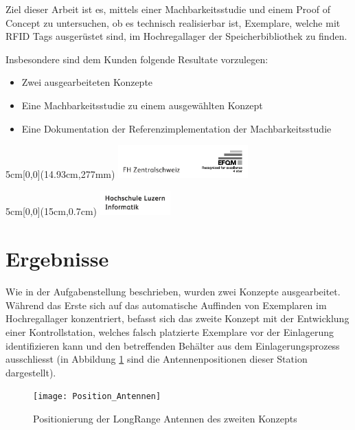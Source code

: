 \documentclass[
	a4paper
]{scrartcl}
\begin{document}
Ziel dieser Arbeit ist es, mittels einer Machbarkeitsstudie und einem Proof of Concept zu untersuchen, ob es technisch realisierbar ist, Exemplare, welche mit RFID Tags ausgerüstet sind, im Hochregallager der Speicherbibliothek zu finden.

Insbesondere sind dem Kunden folgende Resultate vorzulegen:
\begin{itemize}[noitemsep]
	\item Zwei ausgearbeiteten Konzepte
	\item Eine Machbarkeitsstudie zu einem ausgewählten Konzept
	\item Eine Dokumentation der Referenzimplementation der Machbarkeitsstudie
\end{itemize}

\vspace{0.5em}
\noindent
\begin{textblock*}{5cm}[0,0](14.93cm,277mm)
	\includegraphics[keepaspectratio,width=5cm]{img/FHZ_Logo}
\end{textblock*}

\newpage

\begin{textblock*}{5cm}[0,0](15cm,0.7cm)
	\includegraphics[keepaspectratio,width=2.7cm]{img/HSLU_Logo_Header}
\end{textblock*}

\section{Ergebnisse}
Wie in der Aufgabenstellung beschrieben, wurden zwei Konzepte ausgearbeitet. Während das Erste sich auf das automatische Auffinden von Exemplaren im Hochregallager konzentriert, befasst sich das zweite Konzept mit der Entwicklung einer Kontrollstation, welches falsch platzierte Exemplare vor der Einlagerung identifizieren kann und den betreffenden Behälter aus dem Einlagerungsprozess ausschliesst (in Abbildung \ref{fig:PosAntennen} sind die Antennenpositionen dieser Station dargestellt).

\begin{figure}[htb]
	\centering
	\texttt{[image: Position\_Antennen]}
	\caption{Positionierung der LongRange Antennen des zweiten Konzepts}
	\label{fig:PosAntennen}
\end{figure}
\end{document}
